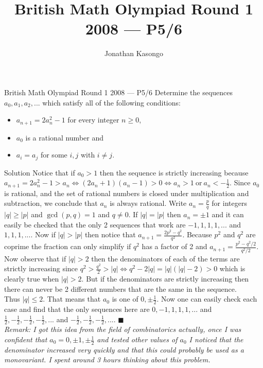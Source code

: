 \documentclass{article}
\author{Jonathan Kasongo}
\title{British Math Olympiad Round 1 2008 --- P5/6}
\begin{document}
\maketitle

\begin{problem}{British Math Olympiad Round 1 2008 --- P5/6}
Determine the sequences $a_0, a_1, a_2, ...$ which satisfy all of the
following conditions:

\begin{itemize}
\item $a_{n+1} = 2 a_n^2 - 1$ for every integer $n \geq 0$,
\item $a_0$ is a rational number and
\item $a_i = a_j$ for some $i,j$ with $i \neq j$.
\end{itemize}
\end{problem}

\begin{solution}{Solution}
Notice that if $a_0 > 1$ then the sequence is strictly increasing because
$a_{n+1} = 2a_n^2 - 1 > a_n \iff (2a_n + 1)(a_n - 1) > 0 \iff
a_n > 1 \ \text{or} \ a_n < -\frac{1}{2}$.
Since $a_0$ is rational, and the set of rational numbers is closed under
multiplication and subtraction, we conclude that $a_n$ is always rational.
Write $a_n = \frac{p}{q}$ for integers $|q| \geq |p|$ and
$\gcd(p, q) = 1$ and $q \neq 0$. If $|q| = |p|$ then $a_n = \pm 1$ and it
can easily be
checked that the only 2 sequences that work are $-1, 1, 1, 1,...$ and
$1, 1, 1, ...$. Now if $|q| > |p|$ then
notice that $a_{n+1} = \frac{2p^2 - q^2}{q^2}$. Because $p^2$ and $q^2$ are
coprime the fraction can only simplify if $q^2$ has a factor of 2 and
$a_{n+1} = \frac{p^2 - q^2 / 2}{q^2 / 2}$. Now observe that if
$|q| > 2$ then the denominators of each of the terms are strictly
increasing
since $q^2 > \frac{q^2}{2} > |q| \iff q^2 - 2|q| = |q|(|q|-2) > 0$ which
is clearly true when $|q|>2$. But if the denominators are strictly
increasing then there can never be 2 different numbers that are the same
in the sequence.\\

Thus $|q| \leq 2$. That means that $a_0$ is one of $0, \pm \frac{1}{2}$.
Now one can easily check each case and find that the only sequences here
are $0, -1, 1, 1, 1, ...$ and $\frac{1}{2}, -\frac{1}{2}, -\frac{1}{2}, -\frac{1}{2},...$
and $-\frac{1}{2}, - \frac{1}{2}, -\frac{1}{2}, ...$. $\blacksquare$\\

\textit{Remark: I got this idea from the field of combinatorics actually,
once I was confident that $a_0 = 0, \pm 1, \pm \frac{1}{2}$ and tested
other values of $a_0$ I noticed that the denominator increased very
quickly and that this could probably be used as a monovariant. I spent
around 3 hours thinking about this problem.}
\end{solution}
\end{document}
